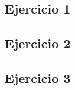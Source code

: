 \documentclass{article}
\theoremstyle{definition}
\theoremstyle{remark}
\begin{document}
\subsection{Ejercicio 1}



\subsection{Ejercicio 2}



\subsection{Ejercicio 3}


\end{document}
